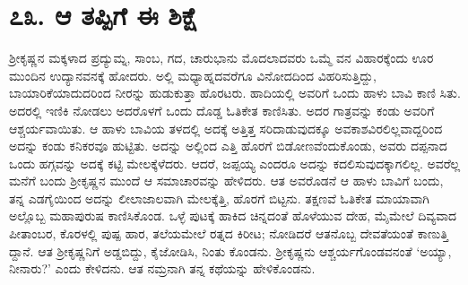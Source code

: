 
\chapter{೭೩. ಆ ತಪ್ಪಿಗೆ ಈ ಶಿಕ್ಷೆ}

ಶ್ರೀಕೃಷ್ಣನ ಮಕ್ಕಳಾದ ಪ್ರದ್ಯುಮ್ನ, ಸಾಂಬ, ಗದ, ಚಾರುಭಾನು ಮೊದಲಾದವರು ಒಮ್ಮೆ ವನ ವಿಹಾರಕ್ಕೆಂದು ಊರ ಮುಂದಿನ ಉದ್ಯಾನವನಕ್ಕೆ ಹೋದರು. ಅಲ್ಲಿ ಮಧ್ಯಾಹ್ನದವರೆಗೂ ವಿನೋದದಿಂದ ವಿಹರಿಸುತ್ತಿದ್ದು, ಬಾಯಾರಿಕೆಯಾದುದರಿಂದ ನೀರನ್ನು ಹುಡುಕುತ್ತಾ ಹೊರಟರು. ಹಾದಿಯಲ್ಲಿ ಅವರಿಗೆ ಒಂದು ಹಾಳು ಬಾವಿ ಕಾಣಿ ಸಿತು. ಅದರಲ್ಲಿ ಇಣಿಕಿ ನೋಡಲು ಅದರೊಳಗೆ ಒಂದು ದೊಡ್ಡ ಓತಿಕೇತ ಕಾಣಿಸಿತು. ಅದರ ಗಾತ್ರವನ್ನು ಕಂಡು ಅವರಿಗೆ ಆಶ್ಚರ್ಯವಾಯಿತು. ಆ ಹಾಳು ಬಾವಿಯ ತಳದಲ್ಲಿ ಅದಕ್ಕೆ ಅತ್ತಿತ್ತ ಸರಿದಾಡುವುದಕ್ಕೂ ಅವಕಾಶವಿರಲಿಲ್ಲವಾದ್ದರಿಂದ ಅದನ್ನು ಕಂಡು ಕನಿಕರವೂ ಹುಟ್ಟಿತು. ಅದನ್ನು ಅಲ್ಲಿಂದ ಎತ್ತಿ ಹೊರಗೆ ಬಿಡೋಣವೆಂದುಕೊಂಡು, ಅವರು ದಪ್ಪನಾದ ಒಂದು ಹಗ್ಗವನ್ನು ಅದಕ್ಕೆ ಕಟ್ಟಿ ಮೇಲಕ್ಕೆಳೆದರು. ಆದರೆ, ಜಪ್ಪಯ್ಯ ಎಂದರೂ ಅದನ್ನು ಕದಲಿಸುವುದಕ್ಕಾಗಲಿಲ್ಲ. ಅವರೆಲ್ಲ ಮನೆಗೆ ಬಂದು ಶ್ರೀಕೃಷ್ಣನ ಮುಂದೆ ಆ ಸಮಾಚಾರವನ್ನು ಹೇಳಿದರು. ಆತ ಅವರೊಡನೆ ಆ ಹಾಳು ಬಾವಿಗೆ ಬಂದು, ತನ್ನ ಎಡಗೈಯಿಂದ ಅದನ್ನು ಲೀಲಾಜಾಲವಾಗಿ ಮೇಲಕ್ಕೆತ್ತಿ, ಹೊರಗೆ ಬಿಟ್ಟನು. ತಕ್ಷಣವೆ ಓತಿಕೇತ ಮಾಯಾವಾಗಿ ಅಲ್ಲೊಬ್ಬ ಮಹಾಪುರುಷ ಕಾಣಿಸಿಕೊಂಡ. ಒಳ್ಳೆ ಪುಟಕ್ಕೆ ಹಾಕಿದ ಚಿನ್ನದಂತೆ ಹೊಳೆಯುವ ದೇಹ, ಮೈಮೇಲೆ ದಿವ್ಯವಾದ ಪೀತಾಂಬರ, ಕೊರಳಲ್ಲಿ ಪುಷ್ಪ ಹಾರ, ತಲೆಯಮೇಲೆ ರತ್ನದ ಕಿರೀಟ; ನೋಡಿದರೆ ಆತನೊಬ್ಬ ದೇವತೆಯಂತೆ ಕಾಣುತ್ತಿ ದ್ದಾನೆ. ಆತ ಶ್ರೀಕೃಷ್ಣನಿಗೆ ಅಡ್ಡಬಿದ್ದು, ಕೈಜೋಡಿಸಿ, ನಿಂತು ಕೊಂಡನು. ಶ್ರೀಕೃಷ್ಣನು ಆಶ್ಚರ್ಯಗೊಂಡವನಂತೆ ‘ಅಯ್ಯಾ, ನೀನಾರು?’ ಎಂದು ಕೇಳಿದನು. ಆತ ನಮ್ರನಾಗಿ ತನ್ನ ಕಥೆಯನ್ನು ಹೇಳಿಕೊಂಡನು.

